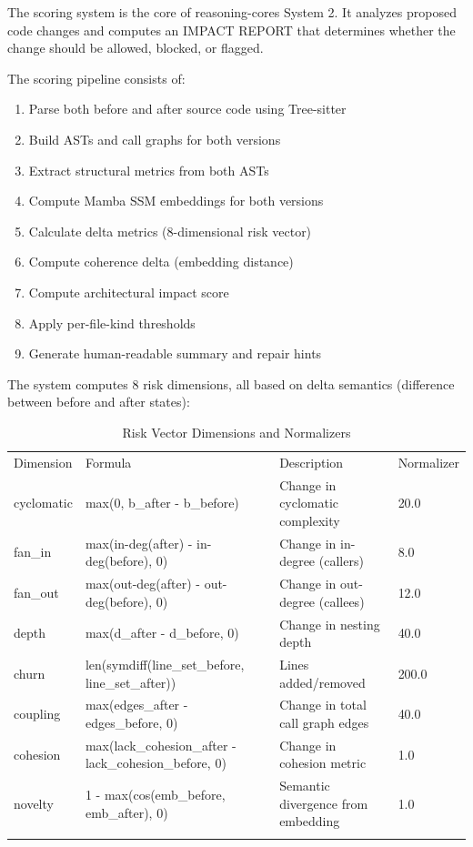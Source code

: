

The scoring system is the core of reasoning-cores System 2. It analyzes proposed code changes and computes an IMPACT REPORT that determines whether the change should be allowed, blocked, or flagged.

The scoring pipeline consists of:

\begin{enumerate}
    \item Parse both before and after source code using Tree-sitter
    \item Build ASTs and call graphs for both versions
    \item Extract structural metrics from both ASTs
    \item Compute Mamba SSM embeddings for both versions
    \item Calculate delta metrics (8-dimensional risk vector)
    \item Compute coherence delta (embedding distance)
    \item Compute architectural impact score
    \item Apply per-file-kind thresholds
    \item Generate human-readable summary and repair hints
\end{enumerate}


The system computes 8 risk dimensions, all based on delta semantics (difference between before and after states):

\begin{table}[t]
    \centering
    \caption{Risk Vector Dimensions and Normalizers}
    \label{tab:risk_vector}
    \begin{tabular}{llp{6cm}l}
        \toprule
        Dimension & Formula & Description & Normalizer \\\n        \midrule
        cyclomatic & max(0, b_after - b_before) & Change in cyclomatic complexity & 20.0 \\\n        fan_in & max(in-deg(after) - in-deg(before), 0) & Change in in-degree (callers) & 8.0 \\\n        fan_out & max(out-deg(after) - out-deg(before), 0) & Change in out-degree (callees) & 12.0 \\\n        depth & max(d_after - d_before, 0) & Change in nesting depth & 40.0 \\\n        churn & len(symdiff(line_set_before, line_set_after)) & Lines added/removed & 200.0 \\\n        coupling & max(edges_after - edges_before, 0) & Change in total call graph edges & 40.0 \\\n        cohesion & max(lack_cohesion_after - lack_cohesion_before, 0) & Change in cohesion metric & 1.0 \\\n        novelty & 1 - max(cos(emb_before, emb_after), 0) & Semantic divergence from embedding & 1.0 \\\n        \bottomrule
    \end{tabular}
\end{table}

